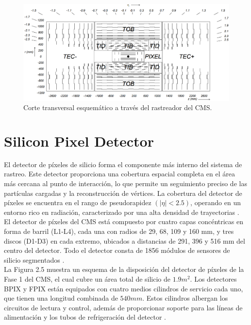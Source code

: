 \begin{center}
  \begin{figure}[ht]
    \centering
    \includegraphics[scale=.23]{Chapter2/strip_layout.png}
    \caption[Corte transversal esquemático a través del rastreador del CMS.]{Corte transversal esquemático a través del rastreador del CMS.}
    \label{strip_layout}
  \end{figure}
\end{center}


\section{Silicon Pixel Detector}

El detector de píxeles de silicio forma el componente más interno del sistema de rastreo. Este detector proporciona una cobertura espacial completa en el área más cercana al punto de interacción, lo que permite un seguimiento preciso de las partículas cargadas y la reconstrucción de vértices. La cobertura del detector de píxeles se encuentra en el rango de pseudorapidez $(|\eta| < 2.5)$, operando en un entorno rico en radiación, caracterizado por una alta densidad de trayectorias \cite{phase1_Pixel_Detector}.\\

El detector de píxeles del CMS está compuesto por cuatro capas concéntricas en forma de barril (L1-L4), cada una con radios de 29, 68, 109 y 160 mm, y tres discos (D1-D3) en cada extremo, ubicados a distancias de 291, 396 y 516 mm del centro del detector. Todo el detector consta de 1856 módulos de sensores de silicio segmentados \cite{CMS_Exp_2008}.\\  

La Figura 2.5 muestra un esquema de la disposición del detector de píxeles de la Fase 1 del CMS, el cual cubre un área total de silicio de $1.9 m^{2}$. Los detectores BPIX y FPIX están equipados con cuatro medios cilindros de servicio cada uno, que tienen una longitud combinada de $540 mm$. Estos cilindros albergan los circuitos de lectura y control, además de proporcionar soporte para las líneas de alimentación y los tubos de refrigeración del detector \cite{phase1_Pixel_Detector}.\\

